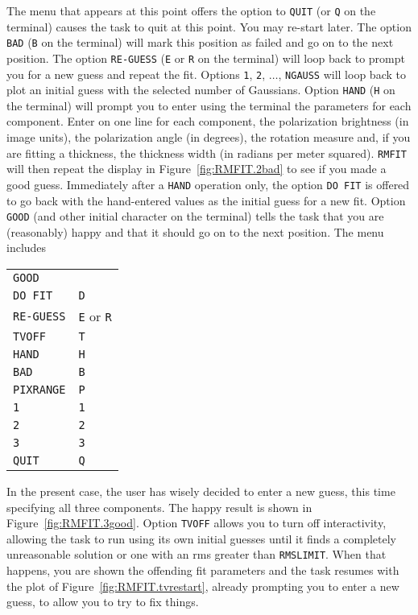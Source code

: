 \documentclass[twoside]{article}
\begin{document}
The menu that appears at this point offers the option to {\tt QUIT}
(or {\tt Q} on the terminal) causes the task to quit at this point.
You may re-start later.  The option {\tt BAD} ({\tt B} on the
terminal) will mark this position as failed and go on to the next
position.   The option {\tt RE-GUESS} ({\tt E} or {\tt R} on the
terminal) will loop back to prompt you for a new guess and repeat the
fit.  Options {\tt 1}, {\tt 2}, $\ldots$, {\tt NGAUSS} will loop back
to plot an initial guess with the selected number of Gaussians.
Option {\tt HAND} ({\tt H} on the terminal) will prompt you to enter
using the terminal the parameters for each component.  Enter on one
line for each component, the polarization brightness (in image units),
the polarization angle (in degrees), the rotation measure and, if you
are fitting a thickness, the thickness width (in radians per meter
squared).  {\tt RMFIT} will then repeat the display in
Figure~\ref{fig:RMFIT.2bad} to see if you made a good guess.
Immediately after a {\tt HAND} operation only, the option {\tt DO FIT}
is offered to go back with the hand-entered values as the initial
guess for a new fit.  Option {\tt GOOD} (and other initial character
on the terminal) tells the task that you are (reasonably) happy and
that it should go on to the next position.  The menu includes

\begin{center}
\begin{tabular}{|l|l|}\hline
   {\tt GOOD}     & {\tt \hphantom{A}} \\
   {\tt DO FIT}   & {\tt D} \\
   {\tt RE-GUESS} & {\tt E} or {\tt R} \\
   {\tt TVOFF}    & {\tt T} \\
   {\tt HAND}     & {\tt H} \\
   {\tt BAD}      & {\tt B} \\
   {\tt PIXRANGE} & {\tt P} \\
   {\tt 1}        & {\tt 1} \\
   {\tt 2}        & {\tt 2} \\
   {\tt 3}        & {\tt 3} \\
   {\tt QUIT}     & {\tt Q} \\ \hline
\end{tabular}
\end{center}

In the present case, the user has wisely decided to enter a new guess,
this time specifying all three components.  The happy result is shown
in Figure~\ref{fig:RMFIT.3good}.  Option {\tt TVOFF} allows you to
turn off interactivity, allowing the task to run using its own initial
guesses until it finds a completely unreasonable solution or one with
an rms greater than {\tt RMSLIMIT}\@.  When that happens, you are
shown the offending fit parameters and the task resumes with the plot
of Figure~\ref{fig:RMFIT.tvrestart}, already prompting you to enter a
new guess, to allow you to try to fix things.
\end{document}
